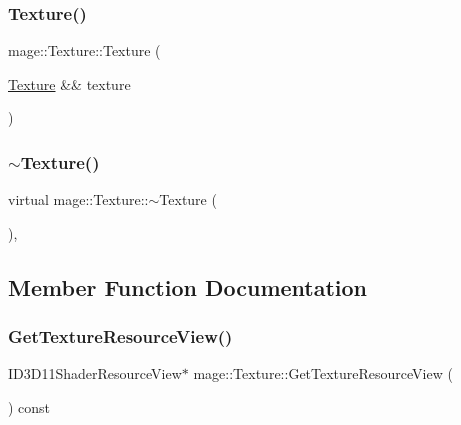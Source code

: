 \hypertarget{classmage_1_1_texture_a9297257bfe76e744cb02bbbb51f73348}{}\label{classmage_1_1_texture_a9297257bfe76e744cb02bbbb51f73348} 
\subsubsection{\texorpdfstring{Texture()}{Texture()}\hspace{0.1cm}{\footnotesize\ttfamily [3/3]}}
{\footnotesize\ttfamily mage\+::\+Texture\+::\+Texture (\begin{DoxyParamCaption}\item[{\hyperlink{classmage_1_1_texture}{Texture} \&\&}]{texture }\end{DoxyParamCaption})\hspace{0.3cm}{\ttfamily [default]}}

\hypertarget{classmage_1_1_texture_a81664804ac0259e8c67851409ee106fa}{}\label{classmage_1_1_texture_a81664804ac0259e8c67851409ee106fa} 
\subsubsection{\texorpdfstring{$\sim$\+Texture()}{~Texture()}}
{\footnotesize\ttfamily virtual mage\+::\+Texture\+::$\sim$\+Texture (\begin{DoxyParamCaption}{ }\end{DoxyParamCaption})\hspace{0.3cm}{\ttfamily [virtual]}, {\ttfamily [default]}}



\subsection{Member Function Documentation}
\hypertarget{classmage_1_1_texture_a8b04efb947c49819642f86c8a16f813b}{}\label{classmage_1_1_texture_a8b04efb947c49819642f86c8a16f813b} 
\subsubsection{\texorpdfstring{Get\+Texture\+Resource\+View()}{GetTextureResourceView()}}
{\footnotesize\ttfamily I\+D3\+D11\+Shader\+Resource\+View$\ast$ mage\+::\+Texture\+::\+Get\+Texture\+Resource\+View (\begin{DoxyParamCaption}{ }\end{DoxyParamCaption}) const}


